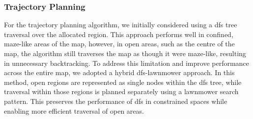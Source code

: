 \documentclass{report_template_oxford}
\begin{document}
\subsubsection{Trajectory Planning}
For the trajectory planning algorithm, we initially considered using a \gls{dfs} tree traversal over the allocated region. This approach performs well in confined, maze-like areas of the map, however, in open areas, such as the centre of the map, the algorithm still traverses the map as though it were maze-like, resulting in unnecessary backtracking.
To address this limitation and improve performance across the entire map, we adopted a hybrid \gls{dfs}-lawnmower approach. In this method, open regions are represented as single nodes within the \gls{dfs} tree, while traversal within those regions is planned separately using a lawnmower search pattern. This preserves the performance of \gls{dfs} in constrained spaces while enabling more efficient traversal of open areas.


\end{document}
